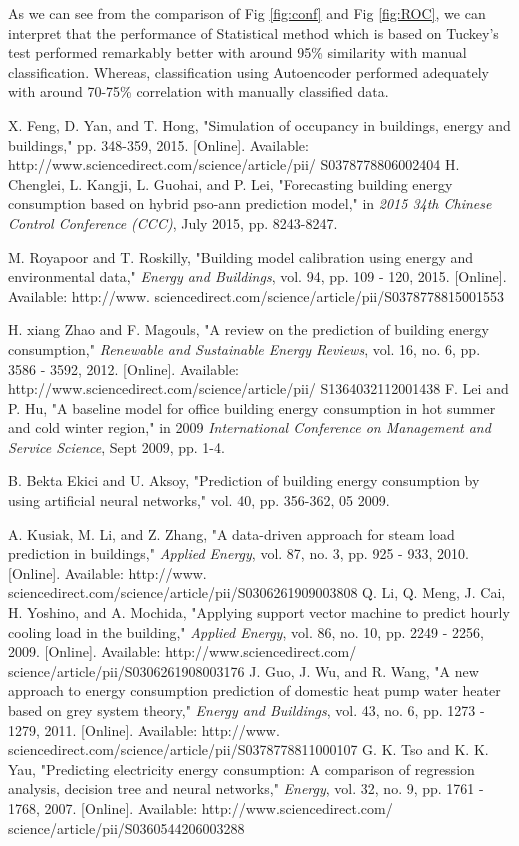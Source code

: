 \documentclass[conference]{IEEEtran}
\begin{document}
As we can see from the comparison of Fig \ref{fig:conf} and Fig \ref{fig:ROC}, we can interpret that the performance of Statistical method which is based on Tuckey's test performed remarkably better with around 95\% similarity with manual classification. Whereas, classification using Autoencoder performed adequately with around 70-75\% correlation with manually classified data.  
 
\begin{thebibliography}{00}
 X. Feng, D. Yan, and T. Hong, "Simulation of occupancy in
buildings, energy and buildings," pp. 348-359, 2015. [Online].
	Available: http://www.sciencedirect.com/science/article/pii/
	S0378778806002404
 H. Chenglei, L. Kangji, L. Guohai, and P. Lei, "Forecasting
building energy consumption based on hybrid pso-ann prediction model," in \textit{2015 34th Chinese Control Conference (CCC)},
July 2015, pp. 8243-8247.

 M. Royapoor and T. Roskilly, "Building model calibration
using energy and environmental data," \textit{Energy and Buildings},
vol. 94, pp. 109 - 120, 2015. [Online]. Available: http://www.
	sciencedirect.com/science/article/pii/S0378778815001553
	
H. xiang Zhao and F. Magouls, "A review on the prediction
of building energy consumption," \textit{Renewable and Sustainable
Energy Reviews}, vol. 16, no. 6, pp. 3586 - 3592, 2012. [Online].
	Available: http://www.sciencedirect.com/science/article/pii/
	S1364032112001438
F. Lei and P. Hu, "A baseline model for office building energy
consumption in hot summer and cold winter region," in 2009
\textit{International Conference on Management and Service Science},
Sept 2009, pp. 1-4.

B. Bekta Ekici and U. Aksoy, "Prediction of building energy
consumption by using artificial neural networks," vol. 40, pp.
356-362, 05 2009.

A. Kusiak, M. Li, and Z. Zhang, "A data-driven approach for
steam load prediction in buildings," \textit{Applied Energy}, vol. 87,
no. 3, pp. 925 - 933, 2010. [Online]. Available: http://www.
	sciencedirect.com/science/article/pii/S0306261909003808
Q. Li, Q. Meng, J. Cai, H. Yoshino, and A. Mochida, "Applying
support vector machine to predict hourly cooling load in
the building," \textit{Applied Energy}, vol. 86, no. 10, pp. 2249 -
	2256, 2009. [Online]. Available: http://www.sciencedirect.com/
	science/article/pii/S0306261908003176
J. Guo, J. Wu, and R. Wang, "A new approach to energy
consumption prediction of domestic heat pump water heater
based on grey system theory," \textit{Energy and Buildings}, vol. 43,
no. 6, pp. 1273 - 1279, 2011. [Online]. Available: http://www.
	sciencedirect.com/science/article/pii/S0378778811000107
G. K. Tso and K. K. Yau, "Predicting electricity energy
consumption: A comparison of regression analysis, decision tree and neural networks," \textit{Energy}, vol. 32, no. 9, pp. 1761 -
	1768, 2007. [Online]. Available: http://www.sciencedirect.com/
	science/article/pii/S0360544206003288
	

\end{thebibliography}
\end{document}
